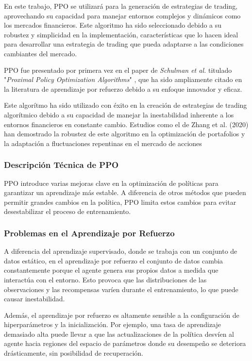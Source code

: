 \documentclass[a4paper,12pt, twoside]{report}
\begin{document}
En este trabajo, PPO se utilizará para la generación de estrategias de trading, aprovechando 
su capacidad para manejar entornos complejos y dinámicos como los mercados financieros. Este 
algoritmo ha sido seleccionado debido a su robustez y simplicidad en la implementación, 
características que lo hacen ideal para desarrollar una estrategia de trading que pueda 
adaptarse a las condiciones cambiantes del mercado.

PPO fue presentado por primera vez en el paper de \textit{Schulman et al.} titulado 
"\textit{Proximal Policy Optimization Algorithms}" \cite{Schulman2017}, que ha sido ampliamente 
citado en la literatura de aprendizaje por refuerzo debido a su enfoque innovador y eficaz.

Este algorítmo ha sido utilizado con éxito en la creación de estrategias de trading 
algorítmico debido a su capacidad de manejar la inestabilidad inherente a los entornos 
financieros en constante cambio. Estudios como el de Zhang et al. (2020) \cite{pricope2021review} han demostrado 
la robustez de este algoritmo en la optimización de portafolios y la adaptación a fluctuaciones repentinas en el mercado de acciones

\subsubsection{Descripción Técnica de PPO}

PPO introduce varias mejoras clave en la optimización de políticas para garantizar un 
aprendizaje más estable. A diferencia de otros métodos que pueden permitir grandes cambios 
en la política, PPO limita estos cambios para evitar desestabilizar el proceso de entrenamiento.

\subsubsection{Problemas en el Aprendizaje por Refuerzo}

A diferencia del aprendizaje supervisado, donde se trabaja con un conjunto de datos estático, 
en el aprendizaje por refuerzo el conjunto de datos cambia constantemente porque el agente 
genera sus propios datos a medida que interactúa con el entorno. Esto provoca que las 
distribuciones de las observaciones y las recompensas varíen durante el entrenamiento, 
lo que puede causar inestabilidad.

Además, el aprendizaje por refuerzo es altamente sensible a la configuración de hiperparámetros 
y la inicialización. Por ejemplo, una tasa de aprendizaje demasiado alta puede llevar a que 
las actualizaciones de la política desvíen al agente hacia regiones del espacio de parámetros 
donde su desempeño se deteriora drásticamente, sin posibilidad de recuperación.
\end{document}
